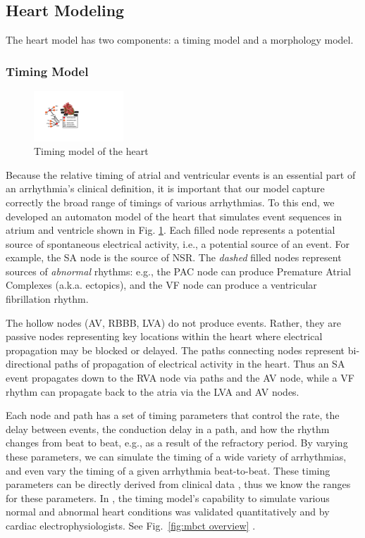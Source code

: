 \subsection{Heart Modeling}
 \label{sec:heart modeling}
The heart model has two components: a timing model and a morphology model.

\subsubsection{Timing Model}
\begin{figure}[t]
	\centering
	\vspace{-10pt}
	\includegraphics[width=0.3\textwidth]{figures/HM_top.pdf}
	\caption{\small Timing model of the heart}
	\vspace{-10pt}
	\label{fig:HM_top}
\end{figure}

Because the relative timing of atrial and ventricular events is an essential part of an arrhythmia's clinical definition, it is important that our model capture correctly the broad range of timings of various arrhythmias.
To this end, we developed an automaton model of the heart that simulates event sequences in atrium and ventricle shown in Fig. \ref{fig:HM_top}. 
Each filled node represents a potential source of spontaneous electrical activity, i.e., a potential source of an event.
For example, the SA node is the source of \ac{NSR}.
The \emph{dashed} filled nodes represent sources of \emph{abnormal} rhythms: e.g., the PAC node can produce Premature Atrial Complexes (a.k.a. ectopics), and the VF node can produce a ventricular fibrillation rhythm.

The hollow nodes (AV, RBBB, LVA) do not produce events. 
Rather, they are passive nodes representing key locations within the heart where electrical propagation may be blocked or delayed.
The paths connecting nodes represent bi-directional paths of propagation of electrical activity in the heart.
Thus an SA event propagates down to the RVA node via paths and the AV node, while a VF rhythm can propagate back to the atria via the LVA and AV nodes.

Each node and path has a set of timing parameters that control the rate, the delay between events, the conduction delay in a path, and how the rhythm changes from beat to beat, e.g., as a result of the refractory period.
By varying these parameters, we can simulate the timing of a wide variety of arrhythmias, and even vary the timing of a given arrhythmia beat-to-beat.
These timing parameters can be directly derived from clinical data \cite{josephson}, thus we know the ranges for these parameters.
In \cite{VHM_proc}, the timing model's capability to simulate various normal and abnormal heart conditions was validated quantitatively and by cardiac electrophysiologists. 
See Fig.~\ref{fig:mbct overview} .

